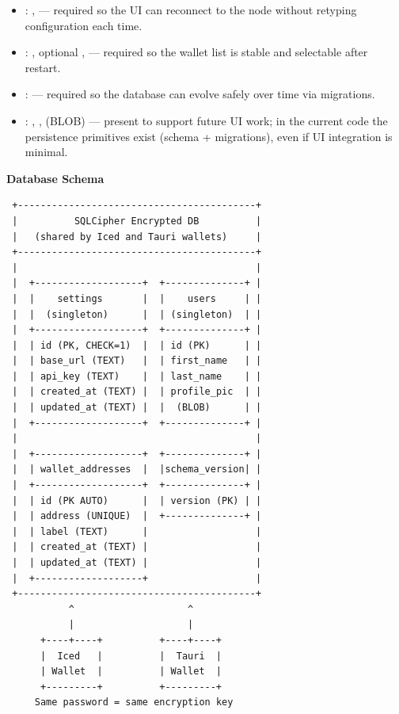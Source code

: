 \begin{itemize}
  \item \textbf{}: ,  --- required so the UI can reconnect to the node without retyping configuration each time.
  \item \textbf{}: , optional ,  --- required so the wallet list is stable and selectable after restart.
  \item \textbf{}:  --- required so the database can evolve safely over time via migrations.
  \item \textbf{}: , ,  (BLOB) --- present to support future UI work; in the current code the persistence primitives exist (schema + migrations), even if UI integration is minimal.
\end{itemize}

\textbf{Database Schema}

\begin{verbatim}
 +------------------------------------------+
 |          SQLCipher Encrypted DB          |
 |   (shared by Iced and Tauri wallets)     |
 +------------------------------------------+
 |                                          |
 |  +-------------------+  +--------------+ |
 |  |    settings       |  |    users     | |
 |  |  (singleton)      |  | (singleton)  | |
 |  +-------------------+  +--------------+ |
 |  | id (PK, CHECK=1)  |  | id (PK)      | |
 |  | base_url (TEXT)   |  | first_name   | |
 |  | api_key (TEXT)    |  | last_name    | |
 |  | created_at (TEXT) |  | profile_pic  | |
 |  | updated_at (TEXT) |  |  (BLOB)      | |
 |  +-------------------+  +--------------+ |
 |                                          |
 |  +-------------------+  +--------------+ |
 |  | wallet_addresses  |  |schema_version| |
 |  +-------------------+  +--------------+ |
 |  | id (PK AUTO)      |  | version (PK) | |
 |  | address (UNIQUE)  |  +--------------+ |
 |  | label (TEXT)      |                   |
 |  | created_at (TEXT) |                   |
 |  | updated_at (TEXT) |                   |
 |  +-------------------+                   |
 +------------------------------------------+
           ^                    ^
           |                    |
      +----+----+          +----+----+
      |  Iced   |          |  Tauri  |
      | Wallet  |          | Wallet  |
      +---------+          +---------+
     Same password = same encryption key
\end{verbatim}

